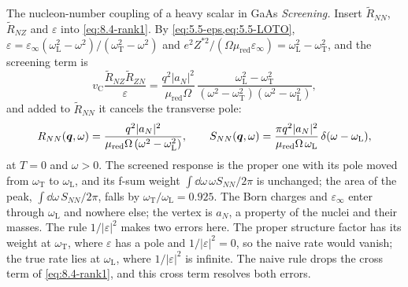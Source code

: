 \begin{workedexample}{The nucleon-number coupling of a heavy scalar in GaAs}
\emph{Screening.} Insert $\tilde R_{NN}$, $\tilde R_{NZ}$ and $\varepsilon$ into \cref{eq:8.4-rank1}. By \cref{eq:5.5-eps,eq:5.5-LOTO}, $\varepsilon = \varepsilon_\infty(\omega_{\mathrm{L}}^2 - \omega^2)/(\omega_{\mathrm{T}}^2 - \omega^2)$ and $e^2Z^{*2}/(\Omega\mu_{\mathrm{red}}\varepsilon_\infty) = \omega_{\mathrm{L}}^2 - \omega_{\mathrm{T}}^2$, and the screening term is
\begin{equation*}
  v_{\mathrm{C}}\frac{\tilde R_{NZ}\tilde R_{ZN}}{\varepsilon} = \frac{q^2|a_N|^2}{\mu_{\mathrm{red}}\Omega}\,\frac{\omega_{\mathrm{L}}^2 - \omega_{\mathrm{T}}^2}{(\omega^2 - \omega_{\mathrm{T}}^2)(\omega^2 - \omega_{\mathrm{L}}^2)} ,
\end{equation*}
and added to $\tilde R_{NN}$ it cancels the transverse pole:
\begin{equation*}
  R_{NN}(\bm{q},\omega) = \frac{q^2|a_N|^2}{\mu_{\mathrm{red}}\Omega\,(\omega^2 - \omega_{\mathrm{L}}^2)} , \qquad
  S_{NN}(\bm{q},\omega) = \frac{\pi q^2|a_N|^2}{\mu_{\mathrm{red}}\Omega\,\omega_{\mathrm{L}}}\,\delta(\omega - \omega_{\mathrm{L}}) ,
\end{equation*}
at $T = 0$ and $\omega > 0$. The screened response is the proper one with its pole moved from $\omega_{\mathrm{T}}$ to $\omega_{\mathrm{L}}$, and its f-sum weight $\int\dd\omega\,\omega S_{NN}/2\pi$ is unchanged; the area of the peak, $\int\dd\omega\,S_{NN}/2\pi$, falls by $\omega_{\mathrm{T}}/\omega_{\mathrm{L}} = 0.925$. The Born charges and $\varepsilon_\infty$ enter through $\omega_{\mathrm{L}}$ and nowhere else; the vertex is $a_N$, a property of the nuclei and their masses. The rule $1/|\varepsilon|^2$ makes two errors here. The proper structure factor has its weight at $\omega_{\mathrm{T}}$, where $\varepsilon$ has a pole and $1/|\varepsilon|^2 = 0$, so the naive rate would vanish; the true rate lies at $\omega_{\mathrm{L}}$, where $1/|\varepsilon|^2$ is infinite. The naive rule drops the cross term of \cref{eq:8.4-rank1}, and this cross term resolves both errors.


\end{workedexample}
